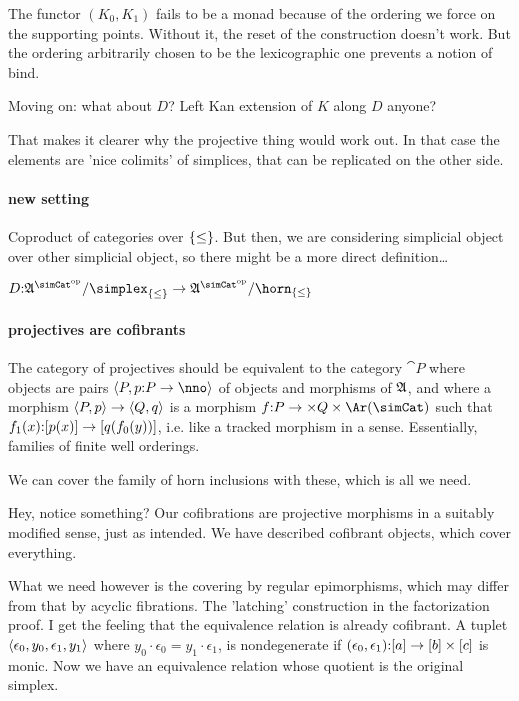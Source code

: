 \documentclass[csh.tex]{subfiles}
\begin{document}
The functor $(K_0,K_1)$ fails to be a monad because of the ordering we force on the supporting points. Without it, the reset of the construction doesn't work. But the ordering arbitrarily chosen to be the lexicographic one prevents a notion of bind.

Moving on: what about $D$? Left Kan extension of $K$ along $D$ anyone?

That makes it clearer why the projective thing would work out.
In that case the elements are 'nice colimits' of simplices, 
that can be replicated on the other side.

\paragraph{new setting}
Coproduct of categories over $\left\{\leq\right\}$. But then, we are considering simplicial object over other simplicial object, so there might be a more direct definition\dots

$D\of \ambient\s/\simplex_{\set\leq} \to \ambient\s/\horn_{\set\leq}$


\paragraph{projectives are cofibrants}
The category of projectives should be equivalent to the category $\cat P$ where objects are pairs $\tuplet{P,p\of P\to\nno}$ of objects and morphisms of $\mathfrak A$, and where a morphism $\left\langle P,p \right\rangle\to \left\langle Q,q \right\rangle$ is a morphism $f\of P\to \times Q\times \Ar(\simCat)$ such that $f_1(x)\mathord : [p(x)]\to [q(f_0(y))]$, i.e. like a tracked morphism in a sense.
Essentially, families of finite well orderings.

We can cover the family of horn inclusions with these, which is all we need.

Hey, notice something? Our cofibrations are projective morphisms in a suitably modified sense, just as intended. We have described cofibrant objects, which cover everything.

What we need however is the covering by regular epimorphisms, which may differ from that by acyclic fibrations. The 'latching' construction in the factorization proof. I get the feeling that the equivalence relation is already cofibrant. A tuplet $\left\langle \epsilon_0,y_0,\epsilon_1,y_1 \right\rangle$ where $y_0\cdot\epsilon_0 = y_1\cdot\epsilon_1$, is nondegenerate if $(\epsilon_0,\epsilon_1)\mathord : [a]\to[b]\times[c]$ is monic. Now we have an equivalence relation whose quotient is the original simplex.
\end{document}
